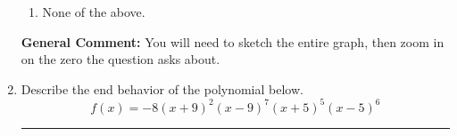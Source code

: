 \documentclass{extbook}[14pt]
\newcommand{\litem}[1]{\item #1

\rule{\textwidth}{0.4pt}}
\begin{document}
\begin{enumerate}
{\begin{enumerate}[label=\Alph*.]
\item None of the above.\end{enumerate}
\textbf{General Comment:} You will need to sketch the entire graph, then zoom in on the zero the question asks about.
}
\litem{
Describe the end behavior of the polynomial below.
\[ f(x) = -8(x + 9)^{2}(x - 9)^{7}(x + 5)^{5}(x - 5)^{6} \]

}
\end{enumerate}
\end{document}
